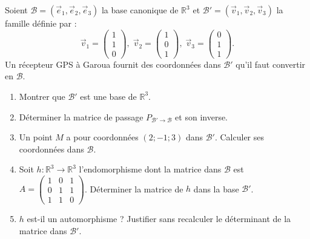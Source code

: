 \documentclass[11pt]{article}
\begin{document}
\begin{exercice}
Soient $\mathcal{B} = (\vec{e}_1, \vec{e}_2, \vec{e}_3)$ la base canonique de $\mathbb{R}^3$ et $\mathcal{B}' = (\vec{v}_1, \vec{v}_2, \vec{v}_3)$ la famille définie par :
$$\vec{v}_1 = \begin{pmatrix} 1 \\ 1 \\ 0 \end{pmatrix},\;
\vec{v}_2 = \begin{pmatrix} 1 \\ 0 \\ 1 \end{pmatrix},\;
\vec{v}_3 = \begin{pmatrix} 0 \\ 1 \\ 1 \end{pmatrix}.$$
Un récepteur GPS à Garoua fournit des coordonnées dans $\mathcal{B}'$ qu'il faut convertir en $\mathcal{B}$.
\begin{enumerate}
    \item Montrer que $\mathcal{B}'$ est une base de $\mathbb{R}^3$.
    \item Déterminer la matrice de passage $P_{\mathcal{B}' \to \mathcal{B}}$ et son inverse.
    \item Un point $M$ a pour coordonnées $(2; -1; 3)$ dans $\mathcal{B}'$. Calculer ses coordonnées dans $\mathcal{B}$.
    \item Soit $h : \mathbb{R}^3 \to \mathbb{R}^3$ l'endomorphisme dont la matrice dans $\mathcal{B}$ est $A = \begin{pmatrix} 1 & 0 & 1 \\ 0 & 1 & 1 \\ 1 & 1 & 0 \end{pmatrix}$. Déterminer la matrice de $h$ dans la base $\mathcal{B}'$.
    \item $h$ est-il un automorphisme ? Justifier sans recalculer le déterminant de la matrice dans $\mathcal{B}'$.
\end{enumerate}
\end{exercice}
\end{document}
